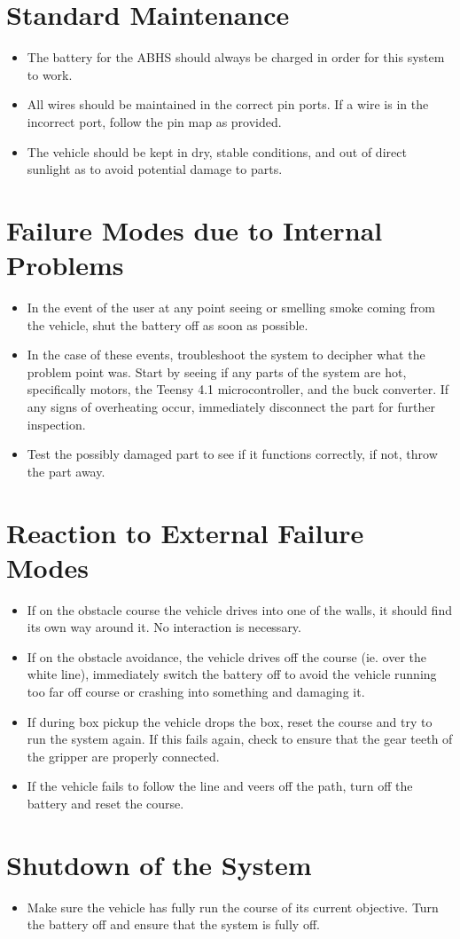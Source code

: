 \documentclass{report}
\begin{document}
\section{Standard Maintenance}
\begin{itemize}
    \item The battery for the \gls{ABHS} should always be charged in order for this system to work.
    \item All wires should be maintained in the correct pin ports. If a wire is in the incorrect port, follow the pin map as provided.
    \item The vehicle should be kept in dry, stable conditions, and out of direct sunlight as to avoid potential damage to parts.
\end{itemize}
\section{Failure Modes due to Internal Problems}
\begin{itemize}
    \item In the event of the user at any point seeing or smelling smoke coming from the vehicle, shut the battery off as soon as possible. 
    \item In the case of these events, troubleshoot the system to decipher what the problem point was. Start by seeing if any parts of the system are hot, specifically motors, the Teensy 4.1 microcontroller, and the buck converter. If any signs of overheating occur, immediately disconnect the part for further inspection.
    \item Test the possibly damaged part to see if it functions correctly, if not, throw the part away.
\end{itemize}
\section{Reaction to External Failure Modes}
\begin{itemize}
    \item If on the obstacle course the vehicle drives into one of the walls, it should find its own way around it. No interaction is necessary. 
    \item If on the obstacle avoidance, the vehicle drives off the course (ie. over the white line), immediately switch the battery off to avoid the vehicle running too far off course or crashing into something and damaging it.
    \item If during box pickup the vehicle drops the box, reset the course and try to run the system again. If this fails again, check to ensure that the gear teeth of the gripper are properly connected.
    \item If the vehicle fails to follow the line and veers off the path, turn off the battery and reset the course. 
\end{itemize}
\section{Shutdown of the System}
\begin{itemize}
    \item Make sure the vehicle has fully run the course of its current objective. Turn the battery off and ensure that the system is fully off.
\end{itemize}
\end{document}
